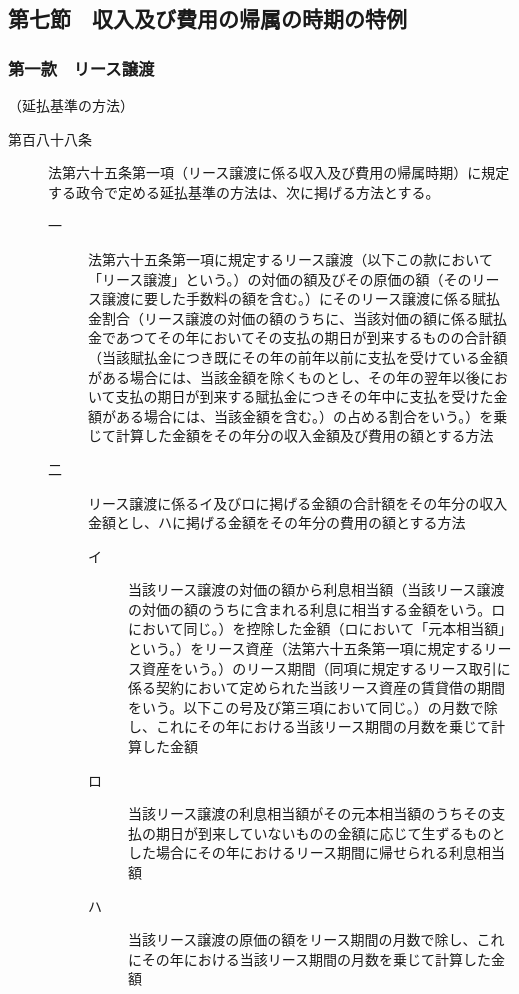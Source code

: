 \documentclass[twocolumn,a4j,10pt]{ltjtarticle}
\begin{document}
\subsection*{第七節　収入及び費用の帰属の時期の特例}
\subsubsection*{第一款　リース譲渡}
\noindent\hspace{10pt}（延払基準の方法）
\begin{description}
\item[第百八十八条]法第六十五条第一項（リース譲渡に係る収入及び費用の帰属時期）に規定する政令で定める延払基準の方法は、次に掲げる方法とする。
\begin{description}
\item[一]法第六十五条第一項に規定するリース譲渡（以下この款において「リース譲渡」という。）の対価の額及びその原価の額（そのリース譲渡に要した手数料の額を含む。）にそのリース譲渡に係る賦払金割合（リース譲渡の対価の額のうちに、当該対価の額に係る賦払金であつてその年においてその支払の期日が到来するものの合計額（当該賦払金につき既にその年の前年以前に支払を受けている金額がある場合には、当該金額を除くものとし、その年の翌年以後において支払の期日が到来する賦払金につきその年中に支払を受けた金額がある場合には、当該金額を含む。）の占める割合をいう。）を乗じて計算した金額をその年分の収入金額及び費用の額とする方法
\item[二]リース譲渡に係るイ及びロに掲げる金額の合計額をその年分の収入金額とし、ハに掲げる金額をその年分の費用の額とする方法
\begin{description}
\item[イ]当該リース譲渡の対価の額から利息相当額（当該リース譲渡の対価の額のうちに含まれる利息に相当する金額をいう。ロにおいて同じ。）を控除した金額（ロにおいて「元本相当額」という。）をリース資産（法第六十五条第一項に規定するリース資産をいう。）のリース期間（同項に規定するリース取引に係る契約において定められた当該リース資産の賃貸借の期間をいう。以下この号及び第三項において同じ。）の月数で除し、これにその年における当該リース期間の月数を乗じて計算した金額
\item[ロ]当該リース譲渡の利息相当額がその元本相当額のうちその支払の期日が到来していないものの金額に応じて生ずるものとした場合にその年におけるリース期間に帰せられる利息相当額
\item[ハ]当該リース譲渡の原価の額をリース期間の月数で除し、これにその年における当該リース期間の月数を乗じて計算した金額

\end{description}
\end{description}
\end{description}
\end{document}
